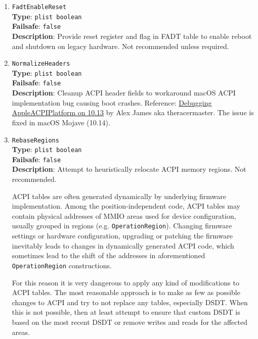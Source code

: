 \documentclass[]{article}
\begin{document}
\begin{enumerate}

\item
  \texttt{FadtEnableReset}\\
  \textbf{Type}: \texttt{plist\ boolean}\\
  \textbf{Failsafe}: \texttt{false}\\
  \textbf{Description}: Provide reset register and flag in FADT table to enable
  reboot and shutdown on legacy hardware. Not recommended unless required.

\item
  \texttt{NormalizeHeaders}\\
  \textbf{Type}: \texttt{plist\ boolean}\\
  \textbf{Failsafe}: \texttt{false}\\
  \textbf{Description}: Cleanup ACPI header fields to workaround macOS
  ACPI implementation bug causing boot crashes. Reference:
  \href{https://alextjam.es/debugging-appleacpiplatform/}{Debugging
  AppleACPIPlatform on 10.13} by Alex James aka theracermaster. The
  issue is fixed in macOS Mojave (10.14).

\item
  \texttt{RebaseRegions}\\
  \textbf{Type}: \texttt{plist\ boolean}\\
  \textbf{Failsafe}: \texttt{false}\\
  \textbf{Description}: Attempt to heuristically relocate ACPI memory
  regions. Not recommended.

  ACPI tables are often generated dynamically by underlying firmware
  implementation. Among the position-independent code, ACPI tables may
  contain physical addresses of MMIO areas used for device
  configuration, usually grouped in regions (e.g.
  \texttt{OperationRegion}). Changing firmware settings or hardware
  configuration, upgrading or patching the firmware inevitably leads to
  changes in dynamically generated ACPI code, which sometimes lead to
  the shift of the addresses in aforementioned \texttt{OperationRegion}
  constructions.

  For this reason it is very dangerous to apply any kind of
  modifications to ACPI tables. The most reasonable approach is to make
  as few as possible changes to ACPI and try to not replace any tables,
  especially DSDT. When this is not possible, then at least attempt to
  ensure that custom DSDT is based on the most recent DSDT or remove
  writes and reads for the affected areas.


\end{enumerate}
\end{document}
